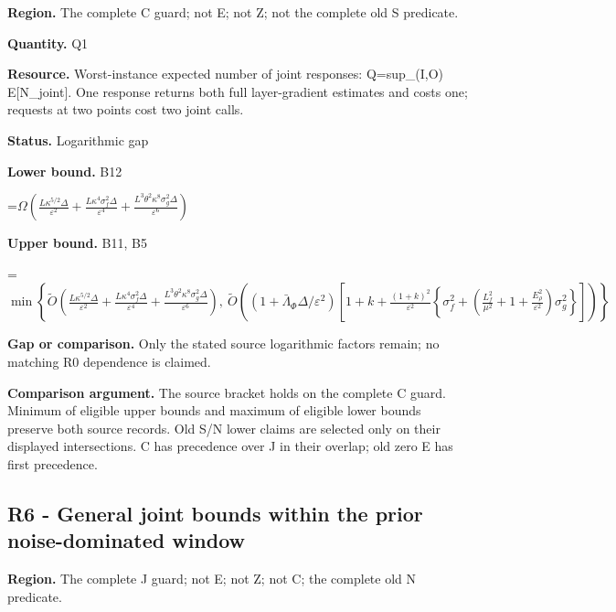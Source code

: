 \documentclass[10pt,a4paper]{article}
\newcommand{\AtlasMath}[1]{\par\begingroup\centering\setbox0=\hbox{$\displaystyle #1$}\ifdim\wd0>1.4\linewidth\typeout{ATLAS WIDE FORMULA: \the\wd0}\fi\ifdim\wd0>\linewidth\resizebox{\linewidth}{!}{\box0}\else\box0\fi\par\endgroup}
\begin{document}
\textbf{Region.} The complete C guard; not E; not Z; not the complete old S predicate.



\textbf{Quantity.} Q1



\textbf{Resource.} Worst-instance expected number of joint responses: Q=sup\_(I,O) E[N\_joint]. One response returns both full layer-gradient estimates and costs one; requests at two points cost two joint calls.



\textbf{Status.} Logarithmic gap



\textbf{Lower bound.} B12



\AtlasMath{\Omega\!\left(\frac{L\kappa^{5/2}\Delta}{\varepsilon^2}+\frac{L\kappa^4\sigma_f^2\Delta}{\varepsilon^4}+\frac{L^3\theta^2\kappa^8\sigma_g^2\Delta}{\varepsilon^6}\right)}


\textbf{Upper bound.} B11, B5



\AtlasMath{\min\left\{\widetilde O\!\left(\frac{L\kappa^{5/2}\Delta}{\varepsilon^2}+\frac{L\kappa^4\sigma_f^2\Delta}{\varepsilon^4}+\frac{L^3\theta^2\kappa^8\sigma_g^2\Delta}{\varepsilon^6}\right),\ \widetilde O\!\left((1+\bar\Lambda_\Phi\Delta/\varepsilon^2)\left[1+k+\frac{(1+k)^2}{\varepsilon^2}\left\{\sigma_f^2+\left(\frac{L_f^2}{\mu^2}+1+\frac{E_\rho^2}{\varepsilon^2}\right)\sigma_g^2\right\}\right]\right)\right\}}


\textbf{Gap or comparison.} Only the stated source logarithmic factors remain; no matching R0 dependence is claimed.



\textbf{Comparison argument.} The source bracket holds on the complete C guard. Minimum of eligible upper bounds and maximum of eligible lower bounds preserve both source records. Old S/N lower claims are selected only on their displayed intersections. C has precedence over J in their overlap; old zero E has first precedence.



\subsection{R6 - General joint bounds within the prior noise-dominated window}


\textbf{Region.} The complete J guard; not E; not Z; not C; the complete old N predicate.
\end{document}

